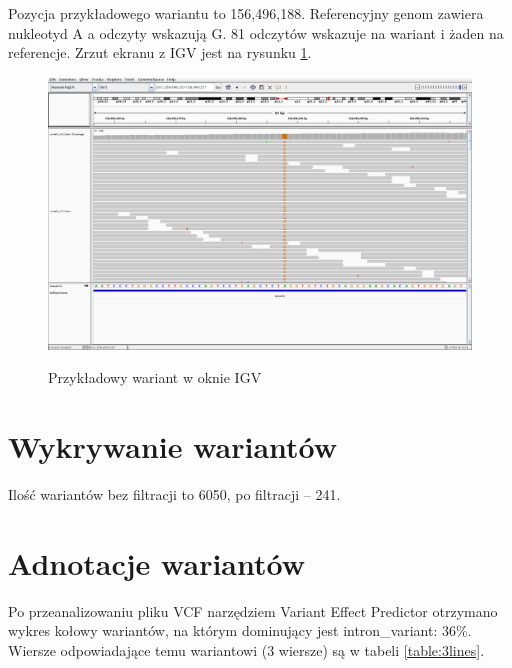 \documentclass[a4paper]{article}
\begin{document}
Pozycja przykładowego wariantu to 156,496,188.
Referencyjny genom zawiera nukleotyd A a odczyty wskazują G.
81 odczytów wskazuje na wariant i żaden na referencje.
Zrzut ekranu z IGV jest na rysunku \ref{fig:igv}.

\begin{figure}[h]
    \centering
    \includegraphics[width=1.0\textwidth]{sampleVariant.png}
    \label{fig:igv}
    \caption[]{Przykładowy wariant w oknie IGV}
\end{figure}


\section{Wykrywanie wariantów}  

Ilość wariantów bez filtracji to 6050, po filtracji -- 241.

\section{Adnotacje wariantów}  
Po przeanalizowaniu pliku VCF narzędziem Variant Effect Predictor otrzymano wykres kołowy wariantów, na którym dominujący jest intron\_variant: 36\%.
Wiersze odpowiadające temu wariantowi (3 wiersze) są w tabeli \ref{table:3lines}.
\end{document}
